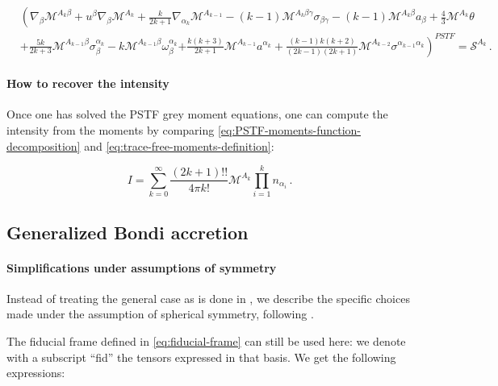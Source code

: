 \documentclass[main.tex]{subfiles}
\begin{document}
\begin{equation} \label{eq:PSTF-grey-moment-equations}
  \begin{split}
    &\left( \nabla _\beta \mathscr M ^{A_k \beta} + u^\beta \nabla_\beta \mathscr M ^{A_k}
    + \frac{k}{2k+1} \nabla_{\alpha_k} \mathscr M ^{A_{k-1}}
    - (k-1) \mathscr M ^{A_k \beta \gamma} \sigma_{\beta \gamma} \right.
    - (k-1) \mathscr M ^{A_k \beta} a_\beta
    + \frac{4}{3} \mathscr M ^{A_k} \theta \\
    &+ \frac{5k}{2k+3} \mathscr M ^{A_{k-1} \beta} \sigma_\beta^{\alpha_k}
    - k \mathscr M ^{A_{k-1} \beta} \omega_\beta ^{\alpha_k}
    \left.+ \frac{k (k+3)}{2k+1} \mathscr M ^{A_{k-1}} a^{\alpha_k}
    + \frac{(k-1) k (k+2) }{(2k-1) (2k+1)} \mathscr M ^{A_{k-2}} \sigma^{\alpha_{k-1} \alpha_k} \right)^{PSTF} = \mathscr S ^{A_k} \,.
  \end{split}
\end{equation}

\paragraph{How to recover the intensity}

Once one has solved the PSTF grey moment equations, one can compute the intensity from the moments by comparing \eqref{eq:PSTF-moments-function-decomposition} and \eqref{eq:trace-free-moments-definition}:

\begin{equation}
  I = \sum _{k=0}   ^{\infty} \frac{(2k+1)!!}{4 \pi k!} \mathscr M^{A_k} \prod_{i=1}^k n_{\alpha_i}\,.
\end{equation}

\subsection{Generalized Bondi accretion}

\paragraph{Simplifications under assumptions of symmetry}

Instead of treating the general case as is done in \cite[]{Thorne:1981feb}, we describe the specific choices made under the assumption of spherical symmetry, following \textcite[]{ThorneFLammmangZytkow:1981feb}.

The fiducial frame defined in \eqref{eq:fiducial-frame} can still be used here: we  denote with a subscript ``fid'' the tensors expressed in that basis. We get the following expressions:
\end{document}
